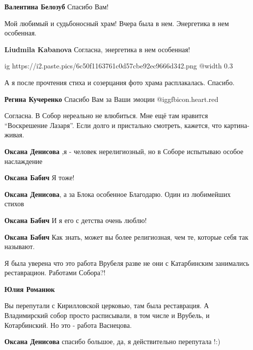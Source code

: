 \begin{itemize}
\textbf{Валентина Белозуб} Спасибо Вам!

Мой любимый и судьбоносный храм! Вчера была в нем. Энергетика в нем особенная.

\textbf{Liudmila Kabanova} Согласна, энергетика в нем особенная!


\ifcmt
  ig https://i2.paste.pics/6c50f1163761c0d57cbe92ec9666d342.png
  @width 0.3
\fi

А я после прочтения стиха и созерцания фото храма расплакалась. Спасибо.

\textbf{Регина Кучеренко} Спасибо Вам за Ваши эмоции @igg{fbicon.heart.red}


Согласна. В Собор нереально не влюбиться. Мне ещё там нравится \enquote{Воскрешение
Лазаря}. Если долго и пристально смотреть, кажется, что картина-живая.

\begin{itemize} %
\textbf{Оксана Денисова} ,я - человек нерелигиозный, но в Соборе испытываю особое наслаждение

\textbf{Оксана Бабич} Я тоже!

\textbf{Оксана Денисова}, а за Блока особенное Благодарю. Один из любимейших стихов

\textbf{Оксана Бабич} И я его с детства очень люблю!

\textbf{Оксана Бабич} Как знать, может вы более религиозная, чем те, которые себя так называют.
\end{itemize} %


Я была уверена что это работа Врубеля разве не они с Катарбинским занимались
реставрацион. Работами Собора?!

\begin{itemize} %
\textbf{Юлия Романюк} 

Вы перепутали с Кирилловской церковью, там была реставрация. А Владимирский
собор просто расписывали, в том числе и Врубель, и Котарбинский. Но это - работа
Васнецова.

\begin{itemize} %
\textbf{Оксана Денисова} спасибо большое, да, я действительно перепутала !:)


\end{itemize}
\end{itemize}
\end{itemize}
